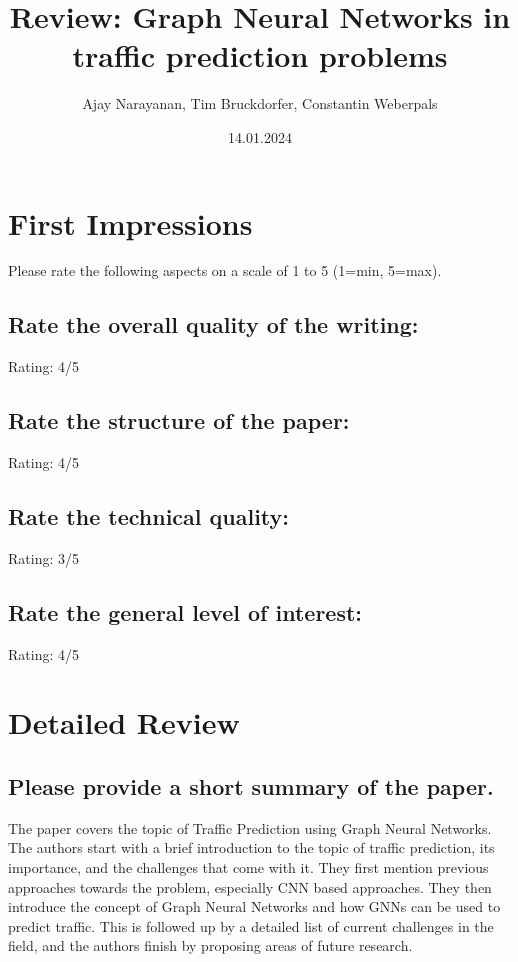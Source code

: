 \documentclass[12pt]{article}
\title{Review: Graph Neural Networks in traffic prediction problems}
\author{Ajay Narayanan, Tim Bruckdorfer, Constantin Weberpals}
\date{14.01.2024}
\begin{document}
\maketitle

\section{First Impressions}
Please rate the following aspects on a scale of 1 to 5 (1=min, 5=max).

\subsection*{Rate the overall quality of the writing:}
Rating: 4/5


\subsection*{Rate the structure of the paper:}
Rating: 4/5

\subsection*{Rate the technical quality:}
Rating: 3/5

\subsection*{Rate the general level of interest:}
Rating: 4/5


\section{Detailed Review}
\subsection*{Please provide a short summary of the paper.}
The paper covers the topic of Traffic Prediction using Graph Neural Networks. The authors start with a brief introduction to the topic 
of traffic prediction, its importance, and the challenges that come with it. They first mention previous approaches towards the problem,
especially CNN based approaches. They then introduce the concept of Graph Neural Networks and how GNNs can be used to 
predict traffic. This is followed up by a detailed list of current challenges in the field, and the authors finish by proposing areas of future
research.
\end{document}
